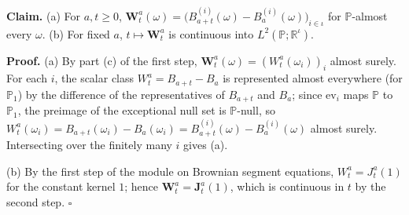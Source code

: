 \documentclass[11pt,a4paper]{article}
\begin{document}
\textbf{Claim.} (a) For \(a,t\ge0\), \(\mathbf W^a_t(\omega)=\bigl(B^{(i)}_{a+t}(\omega)-B^{(i)}_a(\omega)\bigr)_{i\in\iota}\) for \(\mathbb P\)-almost every \(\omega\). (b) For fixed \(a\), \(t\mapsto\mathbf W^a_t\) is continuous into \(L^2(\mathbb P;\mathbb R^\iota)\).




\textbf{Proof.} (a) By part (c) of the first step, \(\mathbf W^a_t(\omega)=(W^a_t(\omega_i))_i\) almost surely. For each \(i\), the scalar class \(W^a_t=B_{a+t}-B_a\) is represented almost everywhere (for \(\mathbb P_1\)) by the difference of the representatives of \(B_{a+t}\) and \(B_a\); since \(\mathrm{ev}_i\) maps \(\mathbb P\) to \(\mathbb P_1\), the preimage of the exceptional null set is \(\mathbb P\)-null, so \(W^a_t(\omega_i)=B_{a+t}(\omega_i)-B_a(\omega_i)=B^{(i)}_{a+t}(\omega)-B^{(i)}_a(\omega)\) almost surely. Intersecting over the finitely many \(i\) gives (a).




(b) By the first step of the module on Brownian segment equations, \(W^a_t=J^a_t(1)\) for the constant kernel \(1\); hence \(\mathbf W^a_t=\mathbf J^a_t(1)\), which is continuous in \(t\) by the second step. \(\square\)
\end{document}
